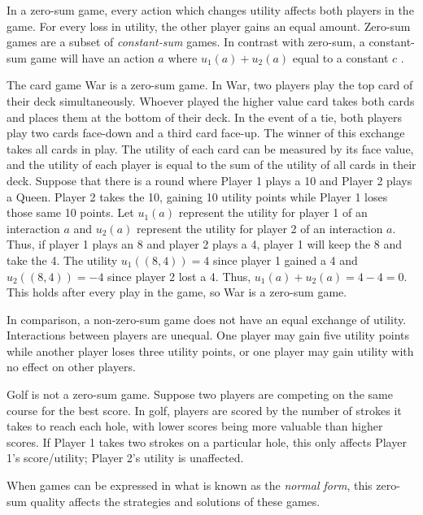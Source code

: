 In a zero-sum game, every action which changes utility affects both players in the game. For every loss in utility, the other player gains an equal amount. Zero-sum games are a subset of \textit{constant-sum} games. In contrast with zero-sum, a constant-sum game will have an action $a$ where $u_1(a)+u_2(a)$ equal to a constant $c$ \cite{shoh09}.

\begin{exmp}
  The card game War is a zero-sum game. In War, two players play the top card of their deck simultaneously. Whoever played the higher value card takes both cards and places them at the bottom of their deck. In the event of a tie, both players play two cards face-down and a third card face-up. The winner of this exchange takes all cards in play. The utility of each card can be measured by its face value, and the utility of each player is equal to the sum of the utility of all cards in their deck. Suppose that there is a round where Player 1 plays a 10 and Player 2 plays a Queen. Player 2 takes the 10, gaining 10 utility points while Player 1 loses those same 10 points. Let $u_1(a)$ represent the utility for player 1 of an interaction $a$ and $u_2(a)$ represent the utility for player 2 of an interaction $a$. Thus, if player 1 plays an 8 and player 2 plays a 4, player 1 will keep the 8 and take the 4. The utility $u_1((8, 4))=4$ since player 1 gained a 4 and $u_2((8, 4))=-4$ since player 2 lost a 4. Thus, $u_1(a)+u_2(a)=4-4=0$. This holds after every play in the game, so War is a zero-sum game.
\end{exmp}

In comparison, a non-zero-sum game does not have an equal exchange of utility. Interactions between players are unequal. One player may gain five utility points while another player loses three utility points, or one player may gain utility with no effect on other players.

\begin{exmp}
  Golf is not a zero-sum game. Suppose two players are competing on the same course for the best score. In golf, players are scored by the number of strokes it takes to reach each hole, with lower scores being more valuable than higher scores. If Player 1 takes two strokes on a particular hole, this only affects Player 1's score/utility; Player 2's utility is unaffected.
\end{exmp}

When games can be expressed in what is known as the \textit{normal form}, this zero-sum quality affects the strategies and solutions of these games.

